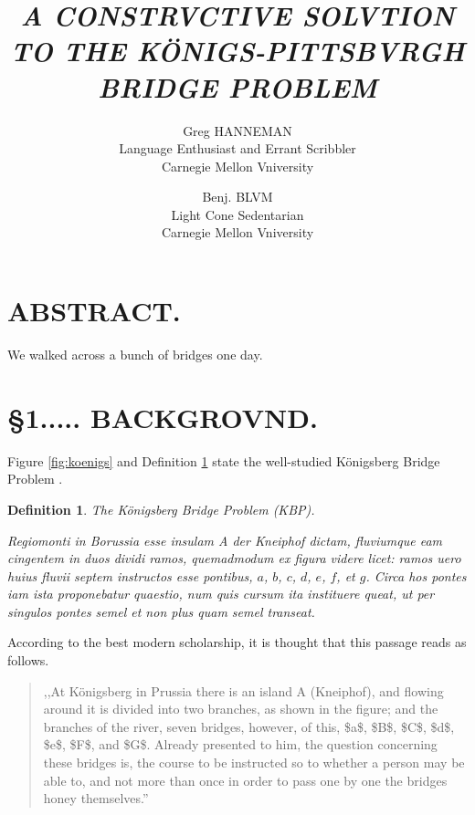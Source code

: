 \documentclass[twocolumn]{article}
\title{\em \huge A CONSTRVCTIVE SOLVTION TO THE K\"ONIGS-PITTSBVRGH BRIDGE PROBLEM}
\author{Greg HANNEMAN\\
	Language Enthusiast and Errant Scribbler
	\\
        Carnegie Mellon Vniversity
	\and
	Benj. BLVM \\
	Light Cone Sedentarian \\
	Carnegie Mellon Vniversity}
\date{}
\theoremstyle{plain}  %
\newtheorem{defn}{Definition}
\theoremstyle{definition}  %
\theoremstyle{remark}  %
\begin{document}

\maketitle
\pagestyle{empty}
\thispagestyle{empty}

\section*{ABSTRACT.}
	We walked across a bunch of bridges one day.



\section*{\S 1..... BACKGROVND.}

Figure \ref{fig:koenigs} and Definition \ref{Def-Konigs} state the well-studied K\"onigsberg Bridge Problem \cite{original}. %

\begin{defn} \label{Def-Konigs}
	The K\"onigsberg Bridge Problem (KBP). %

Regiomonti in Borussia esse insulam A {\em der Kneiphof} dictam, fluviumque eam cingentem in duos dividi ramos, quemadmodum ex figura videre licet: ramos uero huius fluvii septem instructos esse pontibus, $a$, $b$, $c$, $d$, $e$, $f$, et $g$.  Circa hos pontes iam ista proponebatur quaestio, num quis cursum ita instituere queat, ut per singulos pontes semel et non plus quam semel transeat.
\end{defn}

According to the best modern scholarship, it is thought that this passage reads as follows.

\begin{quote}
	,,At K\"onigsberg in Prussia there is an island A (Kneiphof), and flowing around it is divided into two branches, as shown in the figure; and the branches of the river, seven bridges, however, of this, \$a\$, \$B\$, \$C\$, \$d\$, \$e\$, \$F\$, and \$G\$. Already presented to him, the question concerning these bridges is, the course to be instructed so to whether a person may be able to, and not more than once in order to pass one by one the bridges honey themselves.''
\end{quote}
\end{document}
